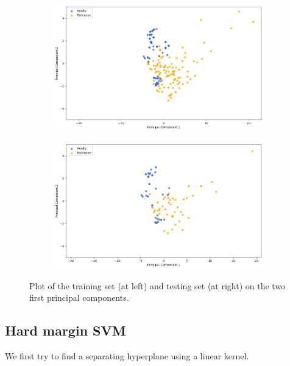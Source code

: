 \begin{figure}[H]
	\centering
	\begin{subfigure}{0.49\textwidth}
		\centering
		\includegraphics[width=\textwidth]{figures/plot_training_set.png}
		\label{fig:plot-training-set}
	\end{subfigure}
	\begin{subfigure}{0.49\textwidth}
		\centering
		\includegraphics[width=\textwidth]{figures/plot_testing_set.png}
		\label{fig:plot-testing-set}
	\end{subfigure}
	\caption{Plot of the training set (at left) and testing set (at right) on the two first principal components.}
\end{figure}

\subsection[short]{Hard margin SVM}

We first try to find a separating hyperplane using a linear kernel.

